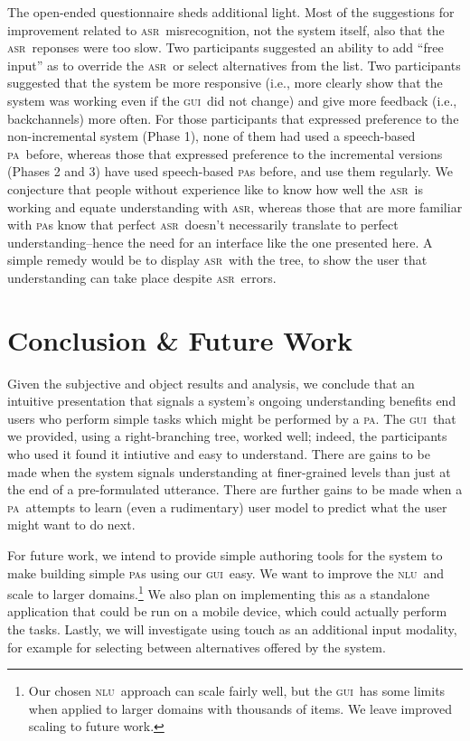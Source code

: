 \documentclass[11pt]{article}
\newcommand{\nlu}[0]{\textsc{nlu}}
\newcommand{\asr}[0]{\textsc{asr}}
\newcommand{\ui}[0]{\textsc{gui}}
\newcommand{\pa}[0]{\textsc{pa}}
\begin{document}
The open-ended questionnaire sheds additional light. Most of the suggestions for improvement related to \asr\ misrecognition, not the system itself, also that the \asr\ reponses were too slow. Two participants suggested an ability to add ``free input'' as to override the \asr\ or select alternatives from the list. Two participants suggested that the system be more responsive (i.e., more clearly show that the system was working even if the \ui\ did not change) and give more feedback (i.e., backchannels) more often. For those participants that expressed preference to the non-incremental system (Phase 1), none of them had used a speech-based \pa\ before, whereas those that expressed preference to the incremental versions (Phases 2 and 3) have used speech-based \pa s before, and use them regularly. We conjecture that people without experience like to know how well the \asr\ is working and equate understanding with \asr, whereas those that are more familiar with \pa s know that perfect \asr\ doesn't necessarily translate to perfect understanding--hence the need for an interface like the one presented here. A simple remedy would be to display \asr\ with the tree, to show the user that understanding can take place despite \asr\ errors.

\section{Conclusion \& Future Work}

Given the subjective and object results and analysis, we conclude that an intuitive presentation that signals a system's ongoing understanding benefits end users who perform simple tasks which might be performed by a \pa. The \ui\ that we provided, using a right-branching tree, worked well; indeed, the participants who used it found it intiutive and easy to understand. There are gains to be made when the system signals understanding at finer-grained levels than just at the end of a pre-formulated utterance. There are further gains to be made when a \pa\ attempts to learn (even a rudimentary) user model to predict what the user might want to do next. 

For future work, we intend to provide simple authoring tools for the system to make building simple \pa s using our \ui\ easy. We want to improve the \nlu\ and scale to larger domains.\footnote{Our chosen \nlu\ approach can scale fairly well, but the \ui\ has some limits when applied to larger domains with thousands of items. We leave improved scaling to future work.} We also plan on implementing this as a standalone application that could be run on a mobile device, which could actually perform the tasks. Lastly, we will investigate using touch as an additional input modality, for example for selecting between alternatives offered by the system.
\end{document}
